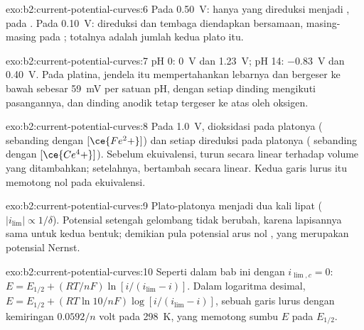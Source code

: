 \begin{solution}{exo:b2:current-potential-curves:6}
Pada \qty{0.50}{V}: hanya  yang direduksi menjadi ,
pada . Pada \qty{0.10}{V}:  direduksi dan tembaga
diendapkan bersamaan, masing-masing pada ; totalnya adalah
jumlah kedua plato itu.
\end{solution}

\begin{solution}{exo:b2:current-potential-curves:7}
pH 0: \qty{0}{V} dan \qty{1.23}{V}; pH 14: \qty{-0.83}{V} dan
\qty{0.40}{V}. Pada platina, jendela itu mempertahankan lebarnya dan
bergeser ke bawah sebesar \qty{59}{mV} per satuan pH, dengan setiap
dinding mengikuti pasangannya, dan dinding anodik tetap tergeser ke atas
oleh  oksigen.
\end{solution}

\begin{solution}{exo:b2:current-potential-curves:8}
Pada \qty{1.0}{V},  dioksidasi pada platonya (
sebanding dengan $[\ce{Fe^2+}]$) dan setiap  direduksi pada
platonya ( sebanding dengan $[\ce{Ce^4+}]$). Sebelum
ekuivalensi,  turun secara linear terhadap volume yang
ditambahkan; setelahnya,  bertambah secara linear. Kedua garis
lurus itu memotong nol pada ekuivalensi.
\end{solution}

\begin{solution}{exo:b2:current-potential-curves:9}
Plato-platonya menjadi dua kali lipat ($|i_{\lim}| \propto 1/\delta$).
Potensial setengah gelombang tidak berubah, karena lapisannya sama untuk
kedua bentuk; demikian pula potensial arus nol , yang
merupakan potensial Nernst.
\end{solution}

\begin{solution}{exo:b2:current-potential-curves:10}
Seperti dalam bab ini dengan $i_{\lim,c} = 0$: $E = E_{1/2} + (RT/nF)\ln[i/(i_{\lim} -
i)]$. Dalam logaritma desimal,
$E = E_{1/2} + (RT\ln 10/nF)\log[i/(i_{\lim} - i)]$, sebuah garis lurus
dengan kemiringan $0.0592/n$ volt pada \qty{298}{K}, yang memotong sumbu
$E$ pada $E_{1/2}$.
\end{solution}

